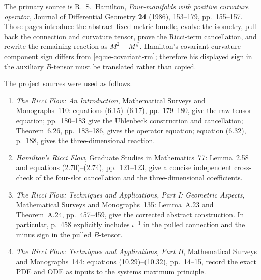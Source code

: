 \documentclass[10pt]{coll-l}
\theoremstyle{definition}
\theoremstyle{remark}
\numberwithin{section}{chapter}
\numberwithin{equation}{chapter}
\begin{document}
The primary source is R.~S.~Hamilton,
\emph{Four-manifolds with positive curvature operator}, Journal of
Differential Geometry \textbf{24} (1986), 153--179,
\href{https://doi.org/10.4310/jdg/1214440433}{pp.~155--157}.  Those pages
introduce the abstract fixed metric bundle, evolve the isometry, pull back
the connection and curvature tensor, prove the Ricci-term cancellation, and
rewrite the remaining reaction as $M^2+M^\#$.  Hamilton's covariant
curvature-component sign differs from
\eqref{eq:ue-covariant-rm}; therefore his displayed sign in the auxiliary
$B$-tensor must be translated rather than copied.

The project sources were used as follows.
\begin{enumerate}
\item \emph{The Ricci Flow: An Introduction}, Mathematical Surveys and
      Monographs~110: equations (6.15)--(6.17), pp.~179--180, give the raw
      tensor equation; pp.~180--183 give the Uhlenbeck construction and
      cancellation; Theorem~6.26, pp.~183--186, gives the operator equation;
      equation (6.32), p.~188, gives the three-dimensional reaction.
\item \emph{Hamilton's Ricci Flow}, Graduate Studies in Mathematics~77:
      Lemma~2.58 and equations (2.70)--(2.74), pp.~121--123, give a concise
      independent cross-check of the four-slot cancellation and the
      three-dimensional coefficients.
\item \emph{The Ricci Flow: Techniques and Applications, Part I:
      Geometric Aspects}, Mathematical Surveys and Monographs~135:
      Lemma~A.23 and
      Theorem~A.24, pp.~457--459, give the corrected abstract construction.
      In particular, p.~458 explicitly includes $\iota^{-1}$ in the pulled
      connection and the minus sign in the pulled $B$-tensor.
\item \emph{The Ricci Flow: Techniques and Applications, Part II},
      Mathematical Surveys and Monographs~144: equations (10.29)--(10.32),
      pp.~14--15, record the exact PDE and ODE as inputs to the systems
      maximum principle.
\end{enumerate}
\end{document}
